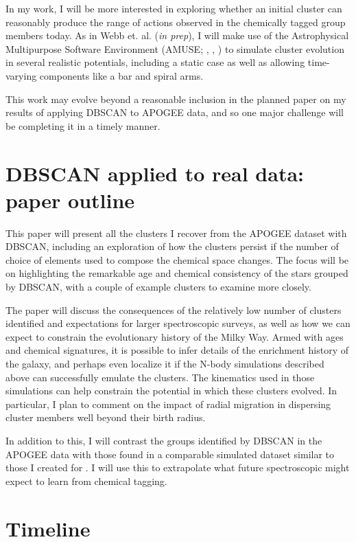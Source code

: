 \documentclass[11pt]{article}
\begin{document}
    In my work, I will be more interested in exploring whether an initial cluster can reasonably produce the range of actions observed in the chemically tagged group members today. As in Webb et. al. (\emph{in prep}), I will make use of the Astrophysical Multipurpose Software Environment (AMUSE; \citealt{PortegiesZwart13}, \citealt{Pelupessy2013}, \citealt{PortegiesZwart2018}) to simulate cluster evolution in several realistic potentials, including a static case as well as allowing time-varying components like a bar and spiral arms.
    
    This work may evolve beyond a reasonable inclusion in the planned paper on my results of applying DBSCAN to APOGEE data, and so one major challenge will be completing it in a timely manner.
 
\section*{DBSCAN applied to real data: paper outline}

This paper will present all the clusters I recover from the APOGEE dataset with DBSCAN, including an exploration of how the clusters persist if the number of choice of elements used to compose the chemical space changes. The focus will be on highlighting the remarkable age and chemical consistency of the stars grouped by DBSCAN, with a couple of example clusters to examine more closely.

The paper will discuss the consequences of the relatively low number of clusters identified and expectations for larger spectroscopic surveys, as well as how we can expect to constrain the evolutionary history of the Milky Way. Armed with ages and chemical signatures, it is possible to infer details of the enrichment history of the galaxy, and perhaps even localize it if the N-body simulations described above can successfully emulate the clusters. The kinematics used in those simulations can help constrain the potential in which these clusters evolved. In particular, I plan to comment on the impact of radial migration in dispersing cluster members well beyond their birth radius.

In addition to this, I will contrast the groups identified by DBSCAN in the APOGEE data with those found in a comparable simulated dataset similar to those I created for \citep{Price-Jones2019}. I will use this to extrapolate what future spectroscopic might expect to learn from chemical tagging.


\section*{Timeline}
\end{document}
